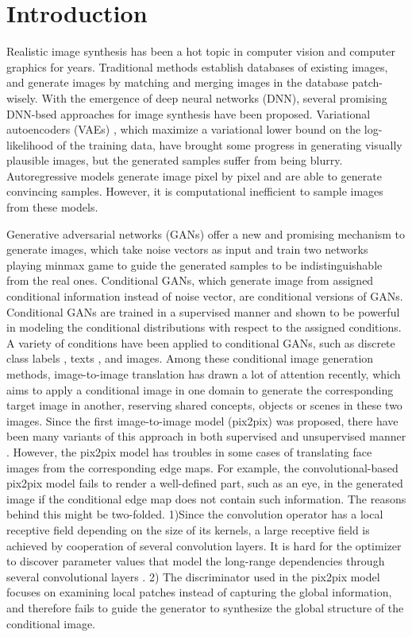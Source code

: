 \section{Introduction}
Realistic image synthesis has been a hot topic in computer vision and computer graphics for years. 
Traditional methods \cite{EBSR, TextureSyn,SceneCompletion} establish databases of existing images, and generate images by matching and merging images in the database patch-wisely. 
With the emergence of deep neural networks (DNN), several promising DNN-bsed approaches for image synthesis have been proposed. 
Variational autoencoders (VAEs) \cite{VAEs}, which maximize a variational lower bound on the log-likelihood of the training data, have brought some progress in generating visually plausible images, but the generated samples suffer from being blurry. 
Autoregressive models \cite{PixelCNN} generate image pixel by pixel and are able to generate convincing samples. However, it is computational inefficient to sample images from these models.
%

Generative adversarial networks (GANs) \cite{GANs} offer a new and promising mechanism to generate images, which take noise vectors as input and train two networks playing minmax game to guide the generated samples to be indistinguishable from the real ones. 
Conditional GANs, which generate image from assigned conditional information instead of noise vector, are conditional versions of GANs. Conditional GANs are trained in a supervised manner and shown to be powerful in modeling the conditional distributions with respect to the assigned conditions. A variety of conditions have been applied to conditional GANs, such as discrete class labels \cite{cGANs}, texts \cite{StackGANs, StackGANs++}, and images.
%
Among these conditional image generation methods, image-to-image translation has drawn a lot of attention recently, which aims to apply a conditional image in one domain to generate the corresponding target image in another, reserving shared concepts, objects or scenes in these two images. Since the first image-to-image model (pix2pix)  \cite{pix2pix} was proposed, there have been many variants of this approach in both supervised and unsupervised manner \cite{CycleGANs, DualGANs,CoupleGANs,BicycleGANs}. 
However, the pix2pix model has troubles in some cases of translating face images from the corresponding edge maps. For example, the convolutional-based pix2pix model fails to render a well-defined part, such as an eye, in the generated image if the conditional edge map does not contain such information. The reasons behind this might be two-folded.
%
1)Since the convolution operator has a local receptive field depending on the size of its kernels, a large receptive field is achieved by cooperation of several convolution layers. It is hard for the optimizer to discover parameter values that model the long-range dependencies through several convolutional layers \cite{SAGANs}. 
2) The discriminator used in the pix2pix model \cite{pix2pix} focuses on examining local patches instead of capturing the global information, and therefore fails to guide the generator to synthesize the global structure of the conditional image. 

